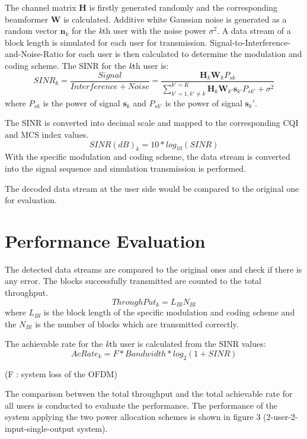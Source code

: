 \documentclass{article}
\begin{document}
\noindent
The channel matrix \textbf{H} is firstly generated randomly and the corresponding beamformer \textbf{W} is calculated.
Additive white Gaussian noise is generated as a random vector $\textbf{n}_k$ for the \textit{k}th user with the noise power $\sigma^2$.
A data stream of a block length is simulated for each user for transmission.
Signal-to-Interference-and-Noise-Ratio for each user is then calculated to determine the modulation and coding scheme.
The SINR for the \textit{k}th user is:
\[
SINR_k = \frac{Signal}{Interference+Noise} = \frac{\textbf{H}_k\textbf{W}_kP_{sk}}{\sum_{k' = 1,k'\neq k}^{k' = K}\textbf{H}_k\textbf{W}_{k'}\textbf{s}_{k'}P_{sk'}+\sigma^2}
\]
where $P_{sk}$ is the power of signal $\textbf{s}_k$ and $P_{sk'}$ is the power of signal $\textbf{s}_k'$.

\noindent
The SINR is converted into decimal scale and mapped to the corresponding CQI and MCS index values.
$$SINR(dB)_k = 10*log_{10}(SINR)$$
With the specific modulation and coding scheme, the data stream is converted into the signal sequence and simulation transmission is performed.

\noindent
The decoded data stream at the user side would be compared to the original one for evaluation.


\section{Performance Evaluation}
The detected data streams are compared to the original ones and check if there is any error. The blocks successfully transmitted are counted to the total throughput.
\[ThroughPut_k = L_{Bl}N_{Bl}\]
where $L_{Bl}$ is the block length of the specific modulation and coding scheme and the $N_{Bl}$ is the number of blocks which are transmitted correctly.

\noindent
The achievable rate for the \textit{k}th user is calculated from the SINR values:
$$AcRate_k = F*Bandwidth*log_2(1+SINR)$$
\begin{center}(F : system loss of the OFDM)\end{center}
The comparison between the total throughput and the total achievable rate for all users is conducted to evaluate the performance.
The performance of the system applying the two power allocation schemes is shown in figure 3 (2-user-2-input-single-output system).
\end{document}
